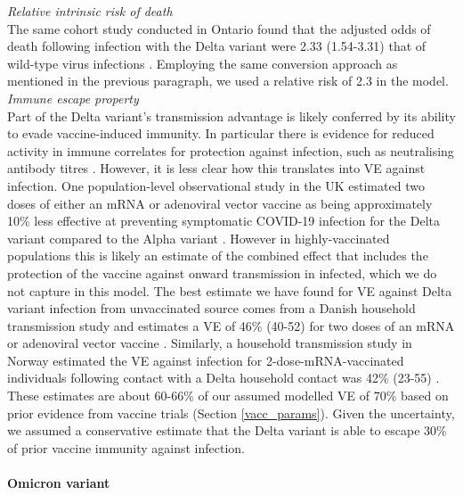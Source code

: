 \textit{Relative intrinsic risk of death}\\
The same cohort study conducted in Ontario found that the adjusted odds of death following infection with the Delta variant were 2.33 (1.54-3.31) that of wild-type virus infections \cite{fisman2021}. 
Employing the same conversion approach as mentioned in the previous paragraph, we used a relative risk of 2.3 in the model.\\

\textit{Immune escape property}\\
Part of the Delta variant's transmission advantage is likely conferred by its ability to evade vaccine-induced immunity. 
In particular there is evidence for reduced activity in immune correlates for protection against infection, such as neutralising 
antibody titres \cite{perezthen2022}. However, it is less clear how this translates into VE against infection. One population-level 
observational study in the UK estimated two doses of either an mRNA or adenoviral vector vaccine as being approximately 10\% less effective 
at preventing symptomatic COVID-19 infection for the Delta variant compared to the Alpha variant \cite{lopezbernal2021}. 
However in highly-vaccinated populations this is likely an estimate of the combined effect that includes the protection of the vaccine 
against onward transmission in infected, which we do not capture in this model. 
The best estimate we have found for VE against Delta variant infection from unvaccinated source comes from a Danish household transmission study and estimates a VE of 46\% (40-52) for two doses of an 
mRNA or adenoviral vector vaccine \cite{lyngse2022c}. 
Similarly, a household transmission study in Norway estimated the VE against infection for 
2-dose-mRNA-vaccinated individuals following contact with a Delta household contact was 42\% (23-55) \cite{jalili2022}. 
These estimates are about 60-66\% of our assumed modelled VE of 70\% based on prior evidence from vaccine trials (Section \ref{vacc_params}). 
Given the uncertainty, we assumed a conservative estimate that the Delta variant is able to escape 30\% of prior vaccine immunity against infection.

\paragraph{Omicron variant}

